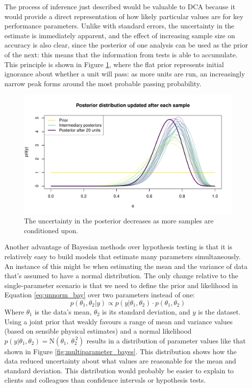 \documentclass[11pt,a4paper,article]{memoir} %
\begin{document}
The process of inference just described would be valuable to DCA because it would provide a direct representation of how likely particular values are for key performance parameters. Unlike with standard errors, the uncertainty in the estimate is immediately apparent, and the effect of increasing sample size on accuracy is also clear, since the posterior of one analysis can be used as the prior of the next: this means that the information from tests is able to accumulate. This principle is shown in Figure \ref{fig:updating_posterior}, where the flat prior represents initial ignorance about whether a unit will pass: as more units are run, an increasingly narrow peak forms around the most probable passing probability.
\begin{figure}
\includegraphics[width=\textwidth]{updating_posterior.pdf}
\caption{The uncertainty in the posterior decreases as more samples are conditioned upon.}
\label{fig:updating_posterior}
\end{figure}
\par

Another advantage of Bayesian methods over hypothesis testing is that it is relatively easy to build models that estimate many parameters simultaneously. An instance of this might be when estimating the mean and the variance of data that's assumed to have a normal distribution. The only change relative to the single-parameter scenario is that we need to define the prior and likelihood in Equation \ref{eq:unnorm_bay} over two parameters instead of one:
\begin{equation}
	p(\theta_1, \theta_2 | y) \propto p(y|\theta_1, \theta_2) \cdot p(\theta_1, \theta_2)
\end{equation}
Where $\theta_1$ is the data's mean, $\theta_2$ is its standard deviation, and $y$ is the dataset. Using a joint prior that weakly favours a range of mean and variance values (based on sensible physical estimates) and a normal likelihood $p(y|\theta_1, \theta_2) = \text{N}(\theta_1, \ \theta_2^{\ 2})$ results in a distribution of parameter values like that shown in Figure \ref{fig:multiparameter_bayes}. This distribution shows how the data reduced uncertainty about what values are reasonable for the mean and standard deviation. This distribution would probably be easier to explain to clients and colleagues than confidence intervals or hypothesis tests.
\end{document}
